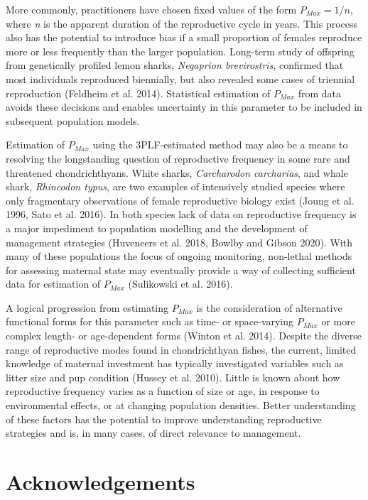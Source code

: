 \documentclass[
]{article}
\begin{document}
More commonly, practitioners have chosen fixed values of the form \(P_{Max} = 1/n\), where \emph{n} is the apparent duration of the reproductive cycle in years. This process also has the potential to introduce bias if a small proportion of females reproduce more or less frequently than the larger population. Long-term study of offspring from genetically profiled lemon sharks, \emph{Negaprion brevirostris}, confirmed that most individuals reproduced biennially, but also revealed some cases of triennial reproduction (Feldheim et al. 2014). Statistical estimation of \(P_{Max}\) from data avoids these decisions and enables uncertainty in this parameter to be included in subsequent population models.

Estimation of \(P_{Max}\) using the 3PLF-estimated method may also be a means to resolving the longstanding question of reproductive frequency in some rare and threatened chondrichthyans. White sharks, \emph{Carcharodon carcharias}, and whale shark, \emph{Rhincodon typus}, are two examples of intensively studied species where only fragmentary observations of female reproductive biology exist (Joung et al. 1996, Sato et al. 2016). In both species lack of data on reproductive frequency is a major impediment to population modelling and the development of management strategies (Huveneers et al. 2018, Bowlby and Gibson 2020). With many of these populations the focus of ongoing monitoring, non-lethal methods for assessing maternal state may eventually provide a way of collecting sufficient data for estimation of \(P_{Max}\) (Sulikowski et al. 2016).

A logical progression from estimating \(P_{Max}\) is the consideration of alternative functional forms for this parameter such as time- or space-varying \(P_{Max}\) or more complex length- or age-dependent forms (Winton et al. 2014). Despite the diverse range of reproductive modes found in chondrichthyan fishes, the current, limited knowledge of maternal investment has typically investigated variables such as litter size and pup condition (Hussey et al. 2010). Little is known about how reproductive frequency varies as a function of size or age, in response to environmental effects, or at changing population densities. Better understanding of these factors has the potential to improve understanding reproductive strategies and is, in many cases, of direct relevance to management.

\section{Acknowledgements}\label{acknowledgements}
\end{document}
